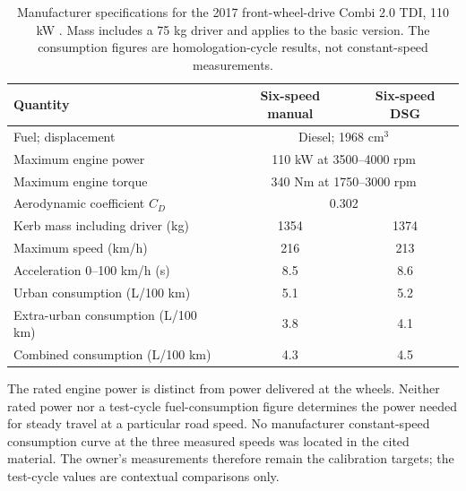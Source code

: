 \documentclass[10pt,a4paper]{article}
\begin{document}
\begin{table}[htbp]
\centering
\caption{Manufacturer specifications for the 2017 front-wheel-drive Combi 2.0 TDI, 110 kW \cite{skoda}. Mass includes a 75 kg driver and applies to the basic version. The consumption figures are homologation-cycle results, not constant-speed measurements.}
\label{tab:factory}
\begin{tabular}{@{}lcc@{}}
\toprule
Quantity & Six-speed manual & Six-speed DSG\\
\midrule
Fuel; displacement & \multicolumn{2}{c}{Diesel; 1968 cm$^3$}\\
Maximum engine power & \multicolumn{2}{c}{110 kW at 3500--4000 rpm}\\
Maximum engine torque & \multicolumn{2}{c}{340 Nm at 1750--3000 rpm}\\
Aerodynamic coefficient $C_D$ & \multicolumn{2}{c}{0.302}\\
Kerb mass including driver (kg) & 1354 & 1374\\
Maximum speed (km/h) & 216 & 213\\
Acceleration 0--100 km/h (s) & 8.5 & 8.6\\
Urban consumption (L/100 km) & 5.1 & 5.2\\
Extra-urban consumption (L/100 km) & 3.8 & 4.1\\
Combined consumption (L/100 km) & 4.3 & 4.5\\
\bottomrule
\end{tabular}
\end{table}

The rated engine power is distinct from power delivered at the wheels. Neither rated power nor a test-cycle fuel-consumption figure determines the power needed for steady travel at a particular road speed. No manufacturer constant-speed consumption curve at the three measured speeds was located in the cited material. The owner's measurements therefore remain the calibration targets; the test-cycle values are contextual comparisons only.
\end{document}
